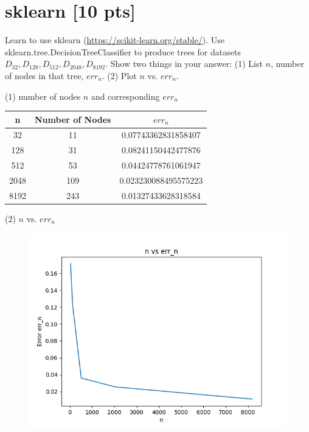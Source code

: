 \documentclass[a4paper]{article}
\theoremstyle{definition}
\newenvironment{soln}{
    \leavevmode\color{blue}\ignorespaces
}{}
\begin{document}
\newpage
\section{sklearn [10 pts]}
Learn to use sklearn (\url{https://scikit-learn.org/stable/}).
Use sklearn.tree.DecisionTreeClassifier to produce trees for datasets $D_{32}, D_{128}, D_{512}, D_{2048}, D_{8192}$.  Show two things in your answer: (1) List $n$, number of nodes in that tree, $err_n$. (2) Plot $n$ vs. $err_n$.

\begin{soln}
    (1) number of nodes $n$ and corresponding $err_n$ \\
    \begin{center}
    \begin{tabular}{ |c| c| c| }
        \hline n & Number of Nodes & $err_n$ \\
        \hline 32 & 11 & 0.07743362831858407 \\
        \hline 128 & 31 & 0.08241150442477876 \\
        \hline 512 & 53 & 0.04424778761061947 \\
        \hline 2048 & 109 & 0.023230088495575223 \\
        \hline 8192 & 243 & 0.01327433628318584 \\
        \hline
    \end{tabular}
    \end{center}
    (2) $n$ vs. $err_n$ \\
    \begin{figure}[h!]
        \centering
        \includegraphics[width=1\textwidth]{images/sklearnnvserr.png}  
        \captionsetup{labelformat=empty}
        \caption{}
        \label{fig:mixed}
    \end{figure}
\end{soln}
\end{document}
